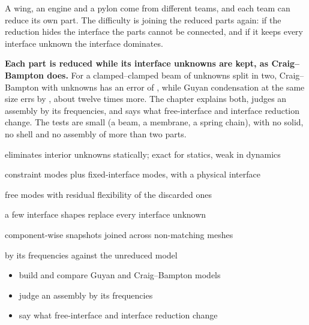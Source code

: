 \newpage\thispagestyle{hl}
\begin{hlquote}A wing, an engine and a pylon come from different teams, and each team can reduce its own part. The difficulty is joining the reduced parts again: if the reduction hides the interface the parts cannot be connected, and if it keeps every interface unknown the interface dominates.\end{hlquote}
\vspace{8pt}\begin{hlsum}\textbf{Each part is reduced while its interface unknowns are kept, as Craig--Bampton does.} For a clamped--clamped beam of \ccmBeamFull{} unknowns split in two, Craig--Bampton with \ccmCbFiveSize{} unknowns has an error of \ccmCbFiveErr, while Guyan condensation at the same size errs by \ccmGuyTwelveErr, about twelve times more. The chapter explains both, judges an assembly by its frequencies, and says what free-interface and interface reduction change. The tests are small (a beam, a membrane, a spring chain), with no solid, no shell and no assembly of more than two parts.\end{hlsum}
\begin{description}\setlength\itemsep{5pt}\setlength\parsep{0pt}\renewcommand{\descriptionlabel}[1]{\hspace{\labelsep}\sffamily\bfseries\color{hlnavy}#1}
\item[Static (Guyan) condensation] eliminates interior unknowns statically; exact for statics, weak in dynamics
\item[Craig--Bampton] constraint modes plus fixed-interface modes, with a physical interface
\item[Free-interface reduction] free modes with residual flexibility of the discarded ones
\item[Interface reduction] a few interface shapes replace every interface unknown
\item[Component POD, mortar tie] component-wise snapshots joined across non-matching meshes
\item[Judging an assembly] by its frequencies against the unreduced model
\end{description}
\begin{itemize}\setlength\itemsep{3pt}
\item build and compare Guyan and Craig--Bampton models
\item judge an assembly by its frequencies
\item say what free-interface and interface reduction change
\end{itemize}
